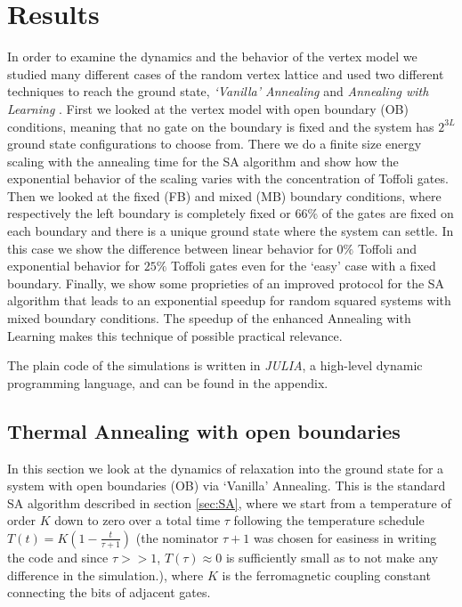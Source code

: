 
\chapter{Results}

In order to examine the dynamics and the behavior of the vertex model we studied many different cases of the random vertex lattice and used two different techniques to reach the ground state, \textit{`Vanilla' Annealing} and \textit{Annealing with Learning} \cite{Chamon}.
First we looked at the vertex model with open boundary (OB) conditions, meaning that no gate on the boundary is fixed and the system has $2^{3L}$ ground state configurations to choose from.
There we do a finite size energy scaling with the annealing time for the SA algorithm and show how the exponential behavior of the scaling varies with the concentration of Toffoli gates.
Then we looked at the fixed (FB) and mixed (MB) boundary conditions, where respectively the left boundary is completely fixed or $66\%$ of the gates are fixed on each boundary and there is a unique ground state where the system can settle.
In this case we show the difference between linear behavior for $0\%$ Toffoli and exponential behavior for $25\%$ Toffoli gates even for the `easy' case with a fixed boundary.
Finally, we show some proprieties of an improved protocol for the SA algorithm that leads to an exponential speedup for random squared systems with mixed boundary conditions.
The speedup of the enhanced Annealing with Learning makes this technique of possible practical relevance.

The plain code of the simulations is written in \textit{JULIA}, a high-level dynamic programming language, and can be found in the appendix.

\section{Thermal Annealing with open boundaries}
In this section we look at the dynamics of relaxation into the ground state for a system with open boundaries (OB) via `Vanilla' Annealing.
This is the standard SA algorithm described in section \ref{sec:SA}, where we start from a temperature of order $K$ down to zero over a total time $\tau$ following the temperature schedule $T(t) = K(1-\frac{t}{\tau + 1})$ (the nominator $\tau +1$ was chosen for easiness in writing the code and since $\tau >>1$, $T(\tau) \approx 0$ is sufficiently small as to not make any difference in the simulation.), where $K$ is the ferromagnetic coupling constant connecting the bits of adjacent gates.

